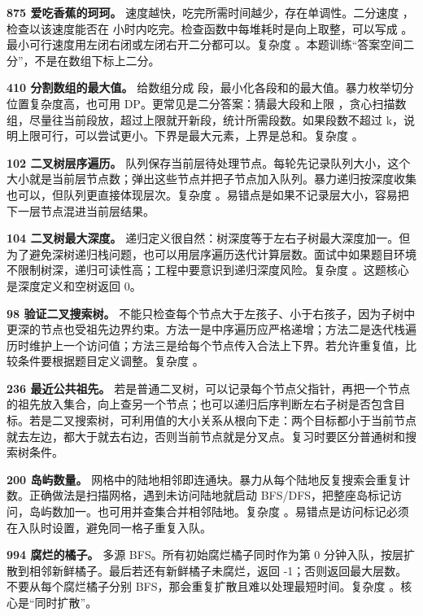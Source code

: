 \textbf{875 爱吃香蕉的珂珂。} 速度越快，吃完所需时间越少，存在单调性。二分速度 ，检查以该速度能否在  小时内吃完。检查函数中每堆耗时是向上取整，可以写成 。最小可行速度用左闭右闭或左闭右开二分都可以。复杂度 。本题训练“答案空间二分”，不是在数组下标上二分。

\textbf{410 分割数组的最大值。} 给数组分成  段，最小化各段和的最大值。暴力枚举切分位置复杂度高，也可用 DP。更常见是二分答案：猜最大段和上限 ，贪心扫描数组，尽量往当前段放，超过上限就开新段，统计所需段数。如果段数不超过 k，说明上限可行，可以尝试更小。下界是最大元素，上界是总和。复杂度 。

\textbf{102 二叉树层序遍历。} 队列保存当前层待处理节点。每轮先记录队列大小，这个大小就是当前层节点数；弹出这些节点并把子节点加入队列。暴力递归按深度收集也可以，但队列更直接体现层次。复杂度 。易错点是如果不记录层大小，容易把下一层节点混进当前层结果。

\textbf{104 二叉树最大深度。} 递归定义很自然：树深度等于左右子树最大深度加一。但为了避免深树递归栈问题，也可以用层序遍历迭代计算层数。面试中如果题目环境不限制树深，递归可读性高；工程中要意识到递归深度风险。复杂度 。这题核心是深度定义和空树返回 0。

\textbf{98 验证二叉搜索树。} 不能只检查每个节点大于左孩子、小于右孩子，因为子树中更深的节点也受祖先边界约束。方法一是中序遍历应严格递增；方法二是迭代栈遍历时维护上一个访问值；方法三是给每个节点传入合法上下界。若允许重复值，比较条件要根据题目定义调整。复杂度 。

\textbf{236 最近公共祖先。} 若是普通二叉树，可以记录每个节点父指针，再把一个节点的祖先放入集合，向上查另一个节点；也可以递归后序判断左右子树是否包含目标。若是二叉搜索树，可利用值的大小关系从根向下走：两个目标都小于当前节点就去左边，都大于就去右边，否则当前节点就是分叉点。复习时要区分普通树和搜索树条件。

\textbf{200 岛屿数量。} 网格中的陆地相邻即连通块。暴力从每个陆地反复搜索会重复计数。正确做法是扫描网格，遇到未访问陆地就启动 BFS/DFS，把整座岛标记访问，岛屿数加一。也可用并查集合并相邻陆地。复杂度 。易错点是访问标记必须在入队时设置，避免同一格子重复入队。

\textbf{994 腐烂的橘子。} 多源 BFS。所有初始腐烂橘子同时作为第 0 分钟入队，按层扩散到相邻新鲜橘子。最后若还有新鲜橘子未腐烂，返回 -1；否则返回最大层数。不要从每个腐烂橘子分别 BFS，那会重复扩散且难以处理最短时间。复杂度 。核心是“同时扩散”。

